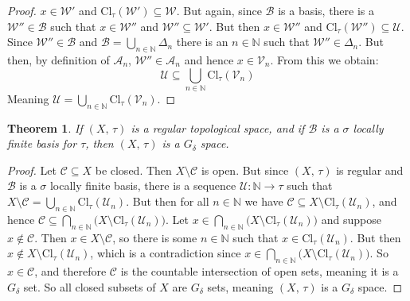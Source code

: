 \documentclass{article}
\theoremstyle{plain}
\newtheorem{theorem}{Theorem}[section]
\theoremstyle{normal}
\begin{document}
\begin{proof}
            $x\in\mathcal{W}'$ and
            $\textrm{Cl}_{\tau}(\mathcal{W}')\subseteq\mathcal{W}$. But again,
            since $\mathcal{B}$ is a basis, there is a
            $\mathcal{W}''\in\mathcal{B}$ such that $x\in\mathcal{W}''$ and
            $\mathcal{W}''\subseteq\mathcal{W}'$. But then
            $x\in\mathcal{W}''$ and
            $\textrm{Cl}_{\tau}(\mathcal{W}'')\subseteq\mathcal{U}$. Since
            $\mathcal{W}''\in\mathcal{B}$ and
            $\mathcal{B}=\bigcup_{n\in\mathbb{N}}\Delta_{n}$ there is an
            $n\in\mathbb{N}$ such that $\mathcal{W}''\in\Delta_{n}$. But then,
            by definition of $\mathcal{A}_{n}$,
            $\mathcal{W}''\in\mathcal{A}_{n}$ and hence
            $x\in\mathcal{V}_{n}$. From this we obtain:
            \begin{equation}
                \mathcal{U}\subseteq\bigcup_{n\in\mathbb{N}}
                    \textrm{Cl}_{\tau}(\mathcal{V}_{n})
            \end{equation}
            Meaning
            $\mathcal{U}=\bigcup_{n\in\mathbb{N}}\textrm{Cl}_{\tau}(\mathcal{V}_{n})$.
        \end{proof}
        \begin{theorem}
            If $(X,\,\tau)$ is a regular topological space, and if
            $\mathcal{B}$ is a $\sigma$ locally finite basis for $\tau$, then
            $(X,\,\tau)$ is a $G_{\delta}$ space.
        \end{theorem}
        \begin{proof}
            Let $\mathcal{C}\subseteq{X}$ be closed. Then
            $X\setminus\mathcal{C}$ is open. But since $(X,\,\tau)$ is regular
            and $\mathcal{B}$ is a $\sigma$ locally finite basis, there is a
            sequence $\mathcal{U}:\mathbb{N}\rightarrow\tau$ such that
            $X\setminus\mathcal{C}=\bigcup_{n\in\mathbb{N}}\textrm{Cl}_{\tau}(\mathcal{U}_{n})$.
            But then for all $n\in\mathbb{N}$ we have
            $\mathcal{C}\subseteq{X}\setminus\textrm{Cl}_{\tau}(\mathcal{U}_{n})$,
            and hence
            $\mathcal{C}\subseteq\bigcap_{n\in\mathbb{N}}\big(X\setminus\textrm{Cl}_{\tau}(\mathcal{U}_{n})\big)$.
            Let $x\in\bigcap_{n\in\mathbb{N}}\big(X\setminus\textrm{Cl}_{\tau}(\mathcal{U}_{n})\big)$
            and suppose $x\notin\mathcal{C}$. Then
            $x\in{X}\setminus\mathcal{C}$, so there is some
            $n\in\mathbb{N}$ such that $x\in\textrm{Cl}_{\tau}(\mathcal{U}_{n})$.
            But then $x\notin{X}\setminus\textrm{Cl}_{\tau}(\mathcal{U}_{n})$,
            which is a contradiction since
            $x\in\bigcap_{n\in\mathbb{N}}\big(X\setminus\textrm{Cl}_{\tau}(\mathcal{U}_{n})\big)$.
            So $x\in\mathcal{C}$, and therefore $\mathcal{C}$ is the countable
            intersection of open sets, meaning it is a $G_{\delta}$ set.
            So all closed subsets of $X$ are $G_{\delta}$ sets, meaning
            $(X,\,\tau)$ is a $G_{\delta}$ space.
        \end{proof}
\end{document}
